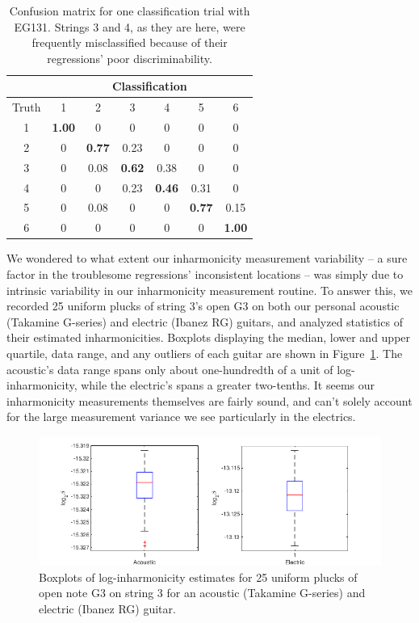 \documentclass[12pt]{cmuthesis}
\begin{document}
\begin{table}
\begin{center}
\begin{tabular}{|c||c|c|c|c|c|c|}
\hline
& \multicolumn{6}{|c|}{Classification} \\
\hline
Truth &1	&2	&3	&4	&5	&6\\
\hline
\hline
1	&\bf{1.00}	& 0	& 0	& 0	&0	& 0 \\ 
\hline
2	&0	& \bf{0.77}	& 0.23	& 0	&0	& 0 \\
\hline
3	&0	& 0.08	& \bf{0.62}	&0.38	& 0	& 0 \\ 
\hline
4	&0	& 0	& 0.23	&\bf{0.46}	& 0.31	& 0 \\
\hline
5	&0	& 0.08	& 0	&0	& \bf{0.77}	& 0.15\\ 
\hline
6	&0	& 0	& 0	&0	&0	& \bf{1.00} \\
\hline
\end{tabular}
\caption{Confusion matrix for one classification trial with EG131. Strings 3 and 4, as they are here, were frequently misclassified because of their regressions' poor discriminability.} 
\label{tab:cf-eg}
\end{center}
\end{table}

We wondered to what extent our inharmonicity measurement variability -- a sure factor in the troublesome regressions' inconsistent locations -- was simply due to intrinsic variability in our inharmonicity measurement routine. To answer this, we recorded 25 uniform plucks of string 3's open G3 on both our personal acoustic (Takamine G-series) and electric (Ibanez RG) guitars, and analyzed statistics of their estimated inharmonicities. Boxplots displaying the median, lower and upper quartile, data range, and any outliers of each guitar are shown in Figure~\ref{fig:meas-variance}. The acoustic's data range spans only about one-hundredth of a unit of log-inharmonicity, while the electric's spans a greater two-tenths. It seems our inharmonicity measurements themselves are fairly sound, and can't solely account for the large measurement variance we see particularly in the electrics. 

\begin{figure}[!htbp] 
\centering
\includegraphics[scale=0.6]{meas-variance}
\caption{Boxplots of log-inharmonicity estimates for 25 uniform plucks of open note G3 on string 3 for an acoustic (Takamine G-series) and electric (Ibanez RG) guitar.}
\label{fig:meas-variance}
\end{figure}
\end{document}
